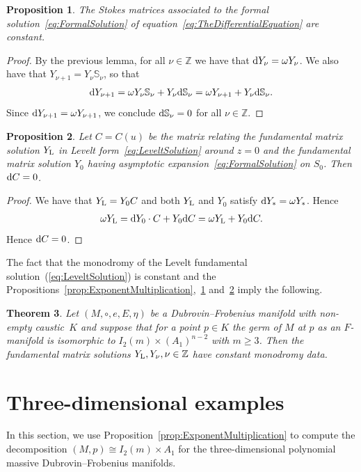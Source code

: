 \documentclass[10pt,a4paper]{amsart}
\numberwithin{equation}{section}
\newtheorem{Theorem}{Theorem}[section]
\newtheorem{Proposition}[Theorem]{Proposition}
 { \theoremstyle{definition}
\newtheorem{Definition}[Theorem]{Definition}
\newtheorem{Note}[Theorem]{Note}
\newtheorem{Example}[Theorem]{Example}
\newtheorem{Remark}[Theorem]{Remark} }
\begin{document}
\begin{Proposition}
 \label{prop:ConstantStokes}
 The Stokes matrices associated to the formal solution~\eqref{eq:FormalSolution} of equation~\eqref{eq:TheDifferentialEquation} are constant.
\end{Proposition}
\begin{proof}
 By the previous lemma, for all $\nu\in\mathbb{Z}$ we have that ${\rm d}Y_{\nu}=\omega Y_{\nu}$. We also have that $Y_{\nu+1}=Y_{\nu}\mathbb{S}_{\nu}$, so that
 \begin{align*}
 {\rm d}Y_{\nu+1} =\omega Y_{\nu}\mathbb{S}_{\nu}+Y_{\nu}{\rm d}\mathbb{S}_{\nu} =\omega Y_{\nu+1}+Y_{\nu}{\rm d}\mathbb{S}_{\nu}.
 \end{align*}
 Since ${\rm d}Y_{\nu+1}=\omega Y_{\nu+1}$, we conclude ${\rm d}\mathbb{S}_{\nu}=0$ for all $\nu\in\mathbb{Z}$.
\end{proof}
\begin{Proposition}
 \label{ConstantConnectionMatrix}
 Let $C=C(u)$ be the matrix relating the fundamental matrix solution $Y_{\rm L}$ in Levelt form~\eqref{eq:LeveltSolution} around $z=0$ and the fundamental matrix solution $Y_{0}$ having asymptotic expansion~\eqref{eq:FormalSolution} on $S_{0}$. Then ${\rm d}C=0$.
\end{Proposition}
\begin{proof}
 We have that $Y_{\rm L}=Y_{0}C$ and both $Y_{\rm L}$ and $Y_{0}$ satisfy ${\rm d}Y_{*}=\omega Y_{*}$. Hence
 \begin{align*}
 \omega Y_{\rm L} ={\rm d}Y_{0}\cdot C+Y_{0}{\rm d} C =\omega Y_{\rm L}+Y_{0}{\rm d}C.
 \end{align*}
 Hence ${\rm d}C=0$.
\end{proof}


The fact that the monodromy of the Levelt fundamental solution~(\ref{eq:LeveltSolution}) is constant and the Propositions~\ref{prop:ExponentMultiplication},~\ref{prop:ConstantStokes} and~\ref{ConstantConnectionMatrix} imply the following.

\begin{Theorem}
 \label{thm:Isomonodromy}
 Let $(M,\circ,e,E,\eta)$ be a Dubrovin--Frobenius manifold with non-empty caustic~$K$ and suppose that for a point $p\in K$ the germ of $M$ at $p$ as an $F$-manifold is isomorphic to $I_{2}(m)\times(A_{1})^{n-2}$ with $m\geq 3$. Then the fundamental matrix solutions $Y_{\rm L},Y_{\nu},\nu\in\mathbb{Z}$ have constant monodromy data.
 \end{Theorem}


 \section{Three-dimensional examples}
\label{sec:Examples}
In this section, we use Proposition~\ref{prop:ExponentMultiplication} to compute the decomposition $(M,p)\cong I_{2}(m)\times A_{1}$ for the three-dimensional polynomial massive Dubrovin--Frobenius manifolds.
\end{document}
